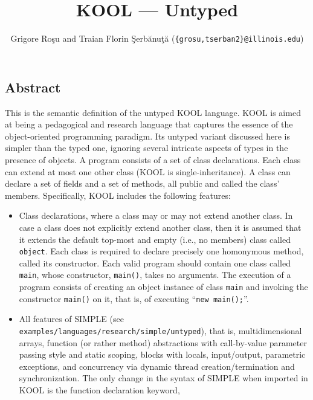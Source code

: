 \setlength{\parindent}{1em}
\title{KOOL --- Untyped}
\author{Grigore Ro\c{s}u and 
        Traian Florin \c{S}erb\u{a}nu\c{t}\u{a} (\texttt{\{grosu,tserban2\}@illinois.edu})}

\maketitle

\begin{latexComment}
\section{Abstract}
This is the \K semantic definition of the untyped KOOL language.
KOOL is aimed at being a pedagogical and research language that
captures the essence of the object-oriented programming paradigm.
Its untyped variant discussed here is simpler than the typed one,
ignoring several intricate aspects of types in the
presence of objects.  A program consists of a set of class declarations.
Each class can extend at most one other class (KOOL is single-inheritance).
A class can declare a set of fields and a set of methods, all public and
called the class' members.
Specifically, KOOL includes the following features:
\begin{itemize}
\item Class declarations, where a class may or may not extend another class.
In case a class does not explicitly extend another class, then it is assumed
that it extends the default top-most and empty (i.e., no members)
class called \texttt{object}.  Each class is required to declare precisely one
homonymous method, called its constructor.  Each valid program should contain
one class called \texttt{main}, whose constructor, \texttt{main()}, takes no
arguments.  The execution of a program consists of creating an object instance
of class \texttt{main} and invoking the constructor \texttt{main()} on it,
that is, of executing ``\texttt{new main();}''.
\item All features of SIMPLE (see
{\footnotesize\texttt{examples/languages/research/simple/untyped}}),
that is, multidimensional arrays, function (or rather method) abstractions
with call-by-value parameter passing style and static scoping, blocks with
locals, input/output, parametric exceptions, and concurrency via dynamic
thread creation/termination and synchronization.  The only change in the
syntax of SIMPLE when imported in KOOL is the function declaration keyword,

\end{itemize}
\end{latexComment}
